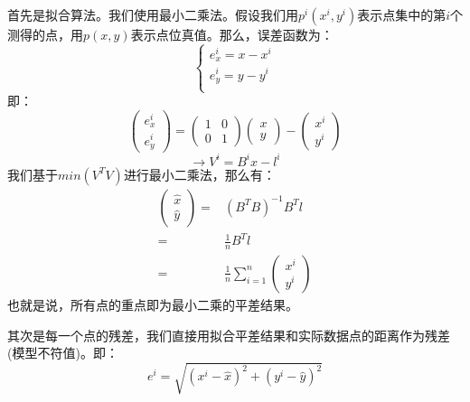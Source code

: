 \documentclass[12pt, twocolumn]{article}
\begin{document}
	首先是拟合算法。我们使用最小二乘法。假设我们用$p^i(x^i,y^i)$表示点集中的第$i$个测得的点，用$p(x,y)$表示点位真值。那么，误差函数为：
	\begin{equation*}
	\begin{cases}
	e_x^i=x-x^i\\
	e_y^i=y-y^i\\
	\end{cases}
	\end{equation*}
	即：
	\begin{equation*}
	\begin{pmatrix}
	e_x^i\\e_y^i
	\end{pmatrix}=\begin{pmatrix}
	1&0\\0&1
	\end{pmatrix}\begin{pmatrix}
	x\\y
	\end{pmatrix}-\begin{pmatrix}
	x^i\\y^i
	\end{pmatrix}
	\end{equation*}
	\begin{equation*}
	\to V^i=B^ix-l^i
	\end{equation*}
	我们基于$min(V^TV)$进行最小二乘法，那么有：
	\begin{equation*}
	\begin{aligned}
	\begin{pmatrix}
	\hat{x}\\\hat{y}
	\end{pmatrix}=&(B^TB)^{-1}B^Tl\\
	=&\frac{1}{n}B^Tl\\
	=&\frac{1}{n}\sum_{i=1}^{n}\begin{pmatrix}
	 x^i\\  y^i
	\end{pmatrix}
	\end{aligned}
	\end{equation*}
	也就是说，所有点的重点即为最小二乘的平差结果。
	
	其次是每一个点的残差，我们直接用拟合平差结果和实际数据点的距离作为残差(模型不符值)。即：
	\begin{equation*}
	e^i=\sqrt{(x^i-\hat{x})^2+(y^i-\hat{y})^2}
	\end{equation*}
	
\end{document}
